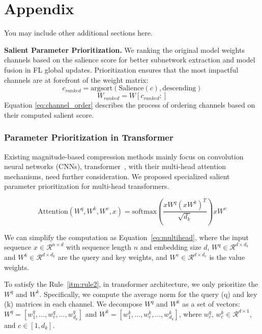 \appendix
\section{Appendix}
You may include other additional sections here.

\textbf{Salient Parameter Prioritization.} 
We ranking the original model weights channels based on the salience score for better subnetwork extraction and model fusion in FL global updates. Prioritization ensures that the most impactful channels are at forefront of the weight matrix:
    \begin{equation}
    c_{ranked} = \text{argsort}(\text{Salience}(c), \text{descending})
    \label{eq:channel_order}
    \end{equation}
    \begin{equation}
    W_{ranked} = W[c_{ranked}:]
    \label{eq:channel_order}
    \end{equation}
    Equation \ref{eq:channel_order} describes the process of ordering channels based on their computed salient score.

 \subsubsection{Parameter Prioritization in Transformer}
Existing magnitude-based compression methods mainly focus on convolution neural networks (CNNs), transformer~\cite{}, with their multi-head attention mechanisms, need further consideration. We proposed specialized salient parameter prioritization for multi-head transformers.

\begin{equation}
\label{eq:multihead}
\text{Attention}(W^q,W^k,W^v,x) = \text{softmax}\left(\frac{xW^q (xW^k)^T}{\sqrt{d_k}}\right) xW^v
\end{equation}

We can simplify the computation as Equation~\ref{eq:multihead}, where the input sequence $x\in \mathcal{R}^{n\times d}$ with sequence length $n$ and embedding size $d$, $W^q \in \mathcal{R}^{d\times d_k}$ and $W^k \in \mathcal{R}^{d\times d_k}$ are the query and key weights, and $W^v \in \mathcal{R}^{d\times d_v}$ is the value weights.

To satisfy the Rule~\ref{itm:rule2}, in transformer architecture, we only prioritize the $W^q$ and $W^k$.  Specifically, we compute the average norm for the query (q) and key (k) matrices in each channel. 
We decompose $W^q$ and $W^k$ as a set of vectors:
$W^q = [w^q_1, ...,w^q_c,..., w^q_{d_k}]$ and $W^k = [w^k_1, ...,w^k_c,..., w^k_{d_k}]$, where $w^q_c \text{,  } w^k_c \in\mathcal{R}^{d\times1}$, and $c \in [1,d_k]$.

